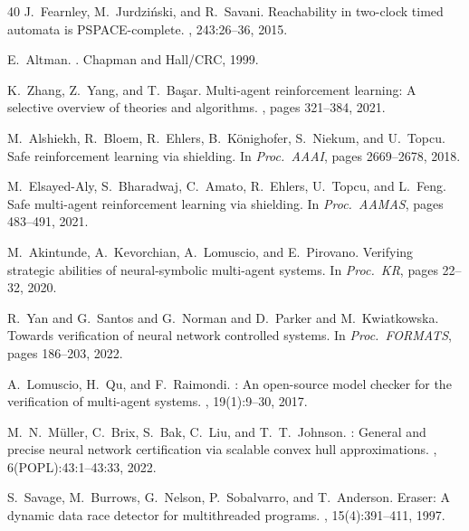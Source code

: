 \documentclass[11pt]{article}
\begin{document}
\begin{thebibliography}{40}
J.~Fearnley, M.~Jurdzi\'{n}ski, and R.~Savani.
\newblock Reachability in two-clock timed automata is {PSPACE}-complete.
, 243:26--36, 2015.

E.~Altman.
.
\newblock Chapman and Hall/CRC, 1999.

K.~Zhang, Z.~Yang, and T.~Ba\c{s}ar.
\newblock Multi-agent reinforcement learning: A selective overview of theories and algorithms.
, pages 321--384, 2021.

M.~Alshiekh, R.~Bloem, R.~Ehlers, B.~K\"{o}nighofer, S.~Niekum, and U.~Topcu.
\newblock Safe reinforcement learning via shielding.
\newblock In {\em Proc.\ AAAI}, pages 2669--2678, 2018.

M.~Elsayed-Aly, S.~Bharadwaj, C.~Amato, R.~Ehlers, U.~Topcu, and L.~Feng.
\newblock Safe multi-agent reinforcement learning via shielding.
\newblock In {\em Proc.\ AAMAS}, pages 483--491, 2021.

M.~Akintunde, A.~Kevorchian, A.~Lomuscio, and E.~Pirovano.
\newblock Verifying strategic abilities of neural-symbolic multi-agent systems.
\newblock In {\em Proc.\ KR}, pages 22--32, 2020.

R.~Yan and G.~Santos and G.~Norman and D.~Parker and M.~Kwiatkowska.
\newblock Towards verification of neural network controlled systems.
\newblock In {\em Proc.\ FORMATS}, pages 186--203, 2022.

A.~Lomuscio, H.~Qu, and F.~Raimondi.
: An open-source model checker for the verification of multi-agent systems.
, 19(1):9--30, 2017.

M.~N.~M\"{u}ller, C.~Brix, S.~Bak, C.~Liu, and T.~T.~Johnson.
: General and precise neural network certification via scalable convex hull approximations.
, 6(POPL):43:1--43:33, 2022.

S.~Savage, M.~Burrows, G.~Nelson, P.~Sobalvarro, and T.~Anderson.
\newblock Eraser: A dynamic data race detector for multithreaded programs.
, 15(4):391--411, 1997.


\end{thebibliography}
\end{document}
